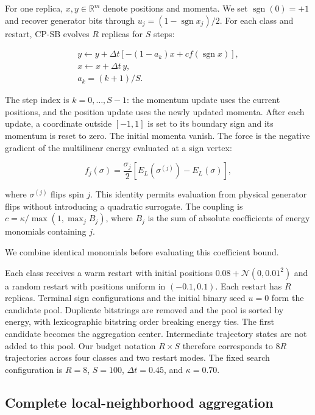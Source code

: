 \documentclass[aps,prapplied,reprint,superscriptaddress,amsmath,amssymb,floatfix,nofootinbib]{revtex4-2}
\begin{document}
For one replica, \(x,y\in\mathbb R^m\) denote positions and momenta. We
set \(\operatorname{sgn}(0)=+1\) and recover generator bits through
\(u_j=(1-\operatorname{sgn}x_j)/2\). For each class and restart, CP-SB
evolves \(R\) replicas for \(S\) steps:

\[
\begin{gathered}
y\leftarrow y+\Delta t[-(1-a_k)x+c f(\operatorname{sgn}x)],
\\ x\leftarrow x+\Delta t\,y,
\\ a_k=(k+1)/S.
\end{gathered}
\tag{5}\label{eq:5}
\]

The step index is \(k=0,\ldots,S-1\): the momentum update uses the
current positions, and the position update uses the newly updated
momenta. After each update, a coordinate outside \([-1,1]\) is set to
its boundary sign and its momentum is reset to zero. The initial momenta
vanish. The force is the negative gradient of the multilinear energy
evaluated at a sign vertex:

\[
f_j(\sigma)=\frac{\sigma_j}{2}
\left[E_L(\sigma^{(j)})-E_L(\sigma)\right],
\tag{6}\label{eq:6}
\]

where \(\sigma^{(j)}\) flips spin \(j\). This identity permits
evaluation from physical generator flips without introducing a quadratic
surrogate. The coupling is \(c=\kappa/\max(1,\max_j B_j)\), where
\(B_j\) is the sum of absolute coefficients of energy monomials
containing \(j\).

We combine identical monomials before evaluating this coefficient bound.

Each class receives a warm restart with initial positions
\(0.08+\mathcal N(0,0.01^2)\) and a random restart with positions
uniform in \((-0.1,0.1)\). Each restart has \(R\) replicas. Terminal
sign configurations and the initial binary seed \(u=0\) form the
candidate pool. Duplicate bitstrings are removed and the pool is sorted
by energy, with lexicographic bitstring order breaking energy ties. The
first candidate becomes the aggregation center. Intermediate trajectory
states are not added to this pool. Our budget notation \(R\times S\)
therefore corresponds to \(8R\) trajectories across four classes and two
restart modes. The fixed search configuration is \(R=8\), \(S=100\),
\(\Delta t=0.45\), and \(\kappa=0.70\).

\subsection{Complete local-neighborhood
aggregation}\label{d.-complete-local-neighborhood-aggregation}
\end{document}
